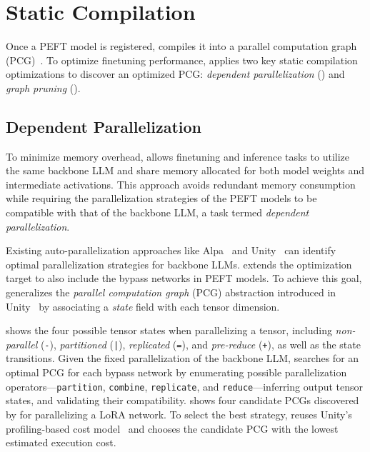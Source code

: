 \section{Static Compilation}
\label{flexllm:sec:compiler}

Once a PEFT model is registered, \FlexLLM compiles it into a parallel computation graph (PCG)~\cite{unger2022unity}. To optimize finetuning performance, \FlexLLM applies two key static compilation optimizations to discover an optimized PCG: {\em dependent parallelization} () and {\em graph pruning} ().

\subsection{Dependent Parallelization}
\label{flexllm:subsec:parallelization}

To minimize memory overhead, \FlexLLM allows finetuning and inference tasks to utilize the same backbone LLM and share memory allocated for both model weights and intermediate activations. This approach avoids redundant memory consumption while requiring the parallelization strategies of the PEFT models to be compatible with that of the backbone LLM, a task termed {\em dependent parallelization}.

Existing auto-parallelization approaches like Alpa~\cite{zheng22-alpa} and Unity~\cite{unger2022unity} can identify optimal parallelization strategies for backbone LLMs.
\FlexLLM extends the optimization target to also include the bypass networks in PEFT models.
To achieve this goal, \FlexLLM generalizes the {\em parallel computation graph} (PCG) abstraction introduced in Unity~\cite{unger2022unity} by associating a {\em state} field with each tensor dimension.

 shows the four possible tensor states when parallelizing a tensor, including {\em non-parallel} ({\tt -}), {\em partitioned} ({\tt |}), {\em replicated} ({\tt =}), and {\em pre-reduce} ({\tt +}), as well as the state transitions.
Given the fixed parallelization of the backbone LLM, \FlexLLM searches for an optimal PCG for each bypass network by enumerating possible parallelization operators---{\tt partition}, {\tt combine}, {\tt replicate}, and {\tt reduce}---inferring output tensor states, and validating their compatibility.
 shows four candidate PCGs discovered by \FlexLLM for parallelizing a LoRA network. To select the best strategy, \FlexLLM reuses Unity's profiling-based cost model~\cite{unger2022unity} and chooses the candidate PCG with the lowest estimated execution cost.

